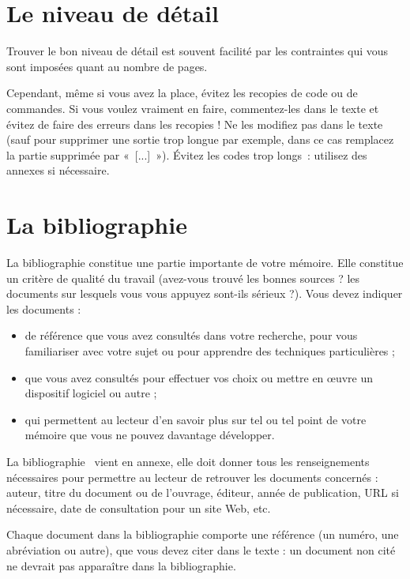 \documentclass [twoside,openright,a4paper,11pt,french] {report}
\begin{document}
\section {Le niveau de détail}

Trouver le bon niveau de détail est souvent facilité par les contraintes
qui vous sont imposées quant au nombre de pages.

Cependant, même si vous avez la place, évitez les recopies de code ou de
commandes. Si vous voulez vraiment en faire, commentez-les dans le texte
et évitez de faire des erreurs dans les recopies ! Ne les modifiez pas
dans le texte (sauf pour supprimer une sortie trop longue par exemple,
dans ce cas remplacez la partie supprimée par «~[...]~»). Évitez
les codes trop longs~: utilisez des annexes si nécessaire.


\section {La bibliographie}

La bibliographie constitue une partie importante de votre mémoire.
Elle constitue un critère de qualité du travail (avez-vous trouvé les
bonnes sources ? les documents sur lesquels vous vous appuyez sont-ils
sérieux ?). Vous devez indiquer les documents :

\begin {itemize}
    \item de référence que vous avez consultés dans votre recherche,
	pour vous familiariser avec votre sujet ou pour apprendre
	des techniques particulières ;
    \item que vous avez consultés pour effectuer vos choix ou mettre
	en œuvre un dispositif logiciel ou autre ;
    \item qui permettent au lecteur d'en savoir plus sur tel ou tel
	point de votre mémoire que vous ne pouvez davantage développer.
\end {itemize}

La bibliographie~\cite {savoirs2010} vient en annexe, elle doit donner
tous les renseignements nécessaires pour permettre au lecteur de
retrouver les documents concernés : auteur, titre du document ou de
l'ouvrage, éditeur, année de publication, URL si nécessaire, date de
consultation pour un site Web, etc.

Chaque document dans la bibliographie comporte une référence (un
numéro, une abréviation ou autre), que vous devez citer dans le texte :
un document non cité ne devrait pas apparaître dans la bibliographie.
\end{document}
